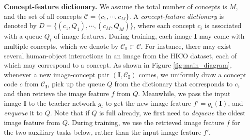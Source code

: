 \documentclass{article} \usepackage{iclr2022_conference,times}
\renewcommand{\paragraph}[1]{\noindent\textbf{#1.}}
\newcommand{\image}{\mathbf{I}}
\begin{document}
\paragraph{Concept-feature dictionary}
We assume the total number of concepts is $M$, and the set of all concepts $\mathcal{C} = \{c_1, \cdots, c_M\}$. A \textit{concept-feature dictionary} is denoted by $D = \{(c_1, Q_1), \cdots, (c_M, Q_M)\}$, where each concept $c_i$ is associated with a queue $Q_i$ of image features. 
During training, each image $\image$ may come with multiple concepts, which we denote by $\mathcal{C}_\image \subset \mathcal{C}$. For instance, there may exist several human-object interactions in an image from the HICO dataset, each of which may correspond to a concept. 
As shown in Figure \ref{fig:main_diagram}, whenever a new image-concept pair $(\image, \mathcal{C}_\image)$ comes, we uniformly draw a concept code $c$ from $\mathcal{C}_\image$, pick up the queue $Q$ from the dictionary that corresponds to $c$, and then retrieve the image feature $f$ from $Q$.
Meanwhile, we pass the input image $\image$ to the teacher network $g_t$ to get the new image feature $f' = g_t(\image)$, and \emph{enqueue} it to $Q$. Note that if $Q$ is full already, we first need to \emph{dequeue} the oldest image feature from $Q$. During training, we use the retrieved image feature $f$ for the two auxiliary tasks below, rather than the input image feature $f'$.
\end{document}
